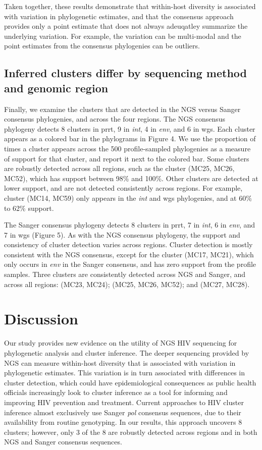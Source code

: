 \documentclass[letterpaper]{article}
\begin{document}
Taken together, these results demonstrate that within-host diversity is associated with variation in phylogenetic estimates, and that the consensus approach provides only a point estimate that does not always adeuqatley summarize the underlying variation. For example, the variation can be multi-modal and the point estimates from the consensus phylogenies can be outliers.

\subsection*{Inferred clusters differ by sequencing method and genomic region}

Finally, we examine the clusters that are detected in the NGS versus Sanger consensus phylogenies, and across the four regions. The NGS consensus phylogeny detects 8 clusters in prrt, 9 in \emph{int}, 4 in \emph{env}, and 6 in wgs. Each cluster appears as a colored bar in the phylograms in Figure 4. We use the proportion of times a cluster appears across the 500 profile-sampled phylogenies as a measure of support for that cluster, and report it next to the colored bar. Some clusters are robustly detected across all regions, such as the cluster (MC25, MC26, MC52), which has support between 98\% and 100\%. Other clusters are detected at lower support, and are not detected consistently across regions. For example, cluster (MC14, MC59) only appears in the \emph{int} and wgs phylogenies, and at 60\% to 62\% support.  

The Sanger consensus phylogeny detects 8 clusters in prrt, 7 in \emph{int}, 6 in \emph{env}, and 7 in wgs (Figure 5). As with the NGS consensus phylogeny, the support and consistency of cluster detection varies across regions. Cluster detection is mostly consistent with the NGS consensus, except for the cluster (MC17, MC21), which only occurs in \emph{env} in the Sanger consensus, and has zero support from the profile samples. Three clusters are consistently detected across NGS and Sanger, and across all regions: (MC23, MC24); (MC25, MC26, MC52); and (MC27, MC28).

\section*{Discussion}

Our study provides new evidence on the utility of NGS HIV sequencing for phylogenetic analysis and cluster inference. The deeper sequencing provided by NGS can measure within-host diversity that is associated with variation in phylogenetic estimates. This variation is in turn associated with differences in cluster detection, which could have epidemiological consequences as public health officials increasingly look to cluster inference as a tool for informing and improving HIV prevention and treatment. Current approaches to HIV cluster inference almost exclusively use Sanger \emph{pol} consensus sequences, due to their availability from routine genotyping. In our results, this approach uncovers 8 clusters; however, only 3 of the 8 are robustly detected across regions and in both NGS and Sanger consensus sequences. 
\end{document}
